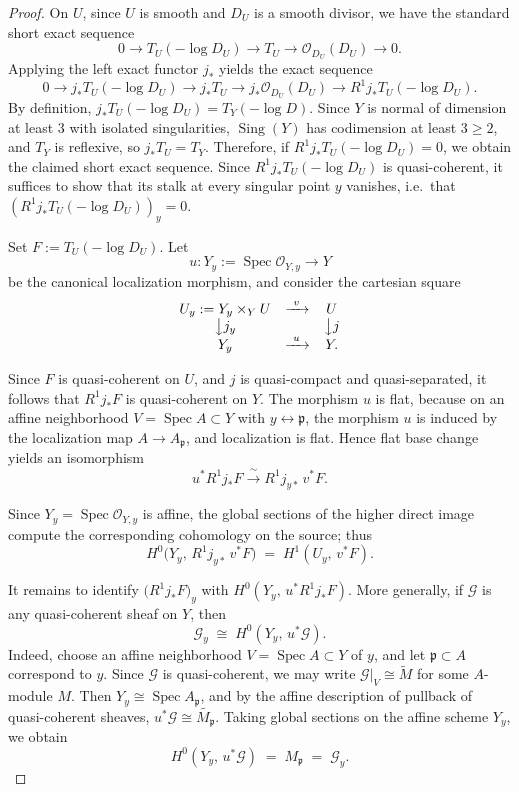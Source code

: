 \documentclass[12pt,twoside,]{amsart}
\theoremstyle{plain}
\theoremstyle{definition}
\begin{document}
\begin{proof}
On $U$, since $U$ is smooth and $D_U$ is a smooth divisor,
we have the standard short exact sequence
\[
0 \longrightarrow T_U(-\log D_U) \longrightarrow T_U
\longrightarrow \mathcal{O}_{D_U}(D_U) \longrightarrow 0.
\]
Applying the left exact functor $j_*$ yields the exact sequence
\[
0 \longrightarrow j_*T_U(-\log D_U)
\longrightarrow j_*T_U
\longrightarrow j_*\mathcal{O}_{D_U}(D_U)
\longrightarrow R^1j_*T_U(-\log D_U).
\]
By definition, $j_*T_U(-\log D_U) = T_Y(-\log D)$.
Since $Y$ is normal of dimension at least $3$ with isolated singularities,
$\operatorname{Sing}(Y)$ has codimension at least $3 \geq 2$, and $T_Y$ is reflexive,
so $j_*T_U = T_Y$.
Therefore, if $R^1j_*T_U(-\log D_U) = 0$, we obtain the claimed
short exact sequence. Since $R^1j_*T_U(-\log D_U)$ is quasi-coherent,
it suffices to show that its stalk at every singular point $y$ vanishes,
i.e.\ that $(R^1j_*T_U(-\log D_U))_y = 0$.

Set $F := T_U(-\log D_U)$.
Let
\[
u:Y_y:=\operatorname{Spec}\mathcal O_{Y,y}\longrightarrow Y
\]
be the canonical localization morphism, and consider the cartesian square
\[
\begin{array}{ccc}
U_y:=Y_y\times_Y U & \xrightarrow{\ v\ } & U\\
\big\downarrow {j_y} & & \big\downarrow {j}\\
Y_y & \xrightarrow{\ u\ } & Y.
\end{array}
\]

Since \(F\) is quasi-coherent on \(U\), and \(j\) is quasi-compact and
quasi-separated, it follows that \(R^1j_*F\) is quasi-coherent on \(Y\).
The morphism \(u\) is flat, because on an affine neighborhood
\(V=\operatorname{Spec}A\subset Y\) with \(y\leftrightarrow \mathfrak p\),
the morphism \(u\) is induced by the localization map
$A\to A_{\mathfrak p}$, and localization is flat.
Hence flat base change yields an isomorphism
\[
u^*R^1j_*F \xrightarrow{\;\sim\;} R^1j_{y*}\,v^*F.
\]

Since \(Y_y=\operatorname{Spec}\mathcal O_{Y,y}\) is affine, the global
sections of the higher direct image compute the corresponding cohomology
on the source; thus
\[
H^0\bigl(Y_y,\,R^1j_{y*}\,v^*F\bigr)
\;=\;
H^1(U_y,\,v^*F).
\]

It remains to identify \(\bigl(R^1j_*F\bigr)_y\) with
\(H^0(Y_y,\,u^*R^1j_*F)\). More generally, if \(\mathcal{G}\) is any
quasi-coherent sheaf on \(Y\), then
\[
\mathcal{G}_y \;\cong\; H^0(Y_y,\,u^*\mathcal{G}).
\]
Indeed, choose an affine neighborhood \(V=\operatorname{Spec}A\subset Y\) of
\(y\), and let \(\mathfrak p\subset A\) correspond to \(y\). Since
\(\mathcal{G}\) is quasi-coherent, we may write
\(\mathcal{G}|_V \cong \widetilde M\)
for some \(A\)-module \(M\). Then \(Y_y\cong \operatorname{Spec}A_{\mathfrak p}\),
and by the affine description of pullback of quasi-coherent sheaves,
\(u^*\mathcal{G} \cong \widetilde{M_{\mathfrak p}}\).
Taking global sections on the affine scheme \(Y_y\), we obtain
\[
H^0(Y_y,\,u^*\mathcal{G})\;=\;M_{\mathfrak p}\;=\;\mathcal{G}_y.
\]


\end{proof}
\end{document}
